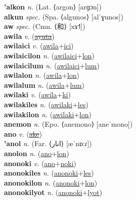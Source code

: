 \textbf{'alkon} \textit{n.} (Lat. ⟨argon⟩ [arɡɔn])
 \label{'alkon} \\
\textbf{alkun} \textit{spec.} (Spa. ⟨algunos⟩ [alˈɣunos])
 \label{alkun} \\
\textbf{aw} \textit{spec.} (Cmn. ⟨和⟩ [xɤ˧˥])
 \label{aw} \\
\textbf{awila} \textit{v.} (\hyperref[ayuta]{\sout{ayuta}})
 \label{awila} \\
\textbf{awilaici} \textit{v.} (\hyperref[awila]{awila}+\hyperref[ici]{ici})
 \label{awilaici} \\
\textbf{awilaicilon} \textit{n.} (\hyperref[awilaici]{awilaici}+\hyperref[lon]{lon})
 \label{awilaicilon} \\
\textbf{awilaicilum} \textit{n.} (\hyperref[awilaici]{awilaici}+\hyperref[lum]{lum})
 \label{awilaicilum} \\
\textbf{awilalon} \textit{n.} (\hyperref[awila]{awila}+\hyperref[lon]{lon})
 \label{awilalon} \\
\textbf{awilalum} \textit{n.} (\hyperref[awila]{awila}+\hyperref[lum]{lum})
 \label{awilalum} \\
\textbf{awilaki} \textit{v.} (\hyperref[awila]{awila}+\hyperref[ki]{ki})
 \label{awilaki} \\
\textbf{awilakiles} \textit{n.} (\hyperref[awilaki]{awilaki}+\hyperref[les]{les})
 \label{awilakiles} \\
\textbf{awilakilon} \textit{n.} (\hyperref[awilaki]{awilaki}+\hyperref[lon]{lon})
 \label{awilakilon} \\
\textbf{anemon} \textit{n.} (Epo. ⟨anemono⟩ [aneˈmono])
 \label{anemon} \\
\textbf{ano} \textit{v.} (\hyperref[ake]{\sout{ake}})
 \label{ano} \\
\textbf{'anol} \textit{n.} (Far. ⟨انار⟩ [æˈnɒːɾ])
 \label{'anol} \\
\textbf{anolon} \textit{n.} (\hyperref[ano]{ano}+\hyperref[lon]{lon})
 \label{anolon} \\
\textbf{anonoki} \textit{v.} (\hyperref[ano]{ano}+\hyperref[noki]{noki})
 \label{anonoki} \\
\textbf{anonokiles} \textit{n.} (\hyperref[anonoki]{anonoki}+\hyperref[les]{les})
 \label{anonokiles} \\
\textbf{anonokilon} \textit{n.} (\hyperref[anonoki]{anonoki}+\hyperref[lon]{lon})
 \label{anonokilon} \\
\textbf{anonokilyot} \textit{n.} (\hyperref[anonoki]{anonoki}+\hyperref[lyot]{lyot})
 \label{anonokilyot} \\
